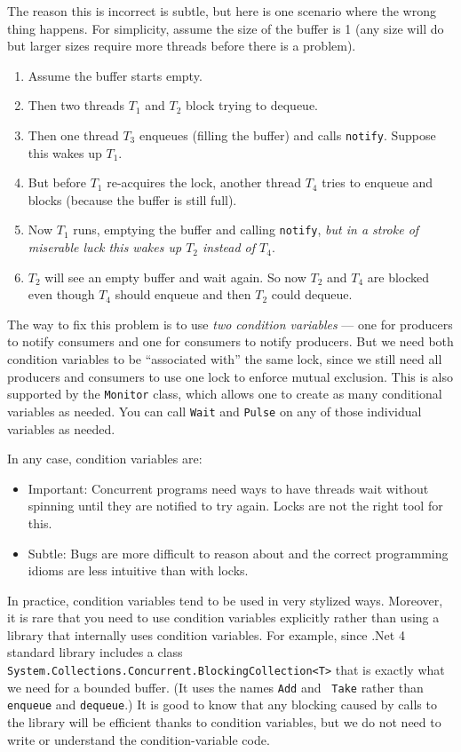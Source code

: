 \documentclass[10pt]{article}
\begin{document}
The reason this is incorrect is subtle, but here is one scenario where
the wrong thing happens.  For simplicity, assume the size of the
buffer is 1 (any size will do but larger sizes require more threads
before there is a problem).
\begin{enumerate}
\item Assume the buffer starts empty.
\item Then two threads $T_1$ and $T_2$ block trying to dequeue.
\item Then one thread $T_3$ enqueues (filling the buffer) and calls
  {\tt notify}.  Suppose this wakes up $T_1$.
\item But before $T_1$ re-acquires the lock, another thread $T_4$
  tries to enqueue and blocks (because the buffer is still full).
\item Now $T_1$ runs, emptying the buffer and calling {\tt notify},
  \emph{but in a stroke of miserable luck this wakes up $T_2$ instead
  of $T_4$}.
\item $T_2$ will see an empty buffer and wait again.  So now $T_2$ and
  $T_4$ are blocked even though $T_4$ should enqueue and then $T_2$
  could dequeue.
\end{enumerate}

The way to fix this problem is to use \emph{two condition variables}
--- one for producers to notify consumers and one for consumers to
notify producers.  But we need both condition variables to be
``associated with'' the same lock, since we still need all producers
and consumers to use one lock to enforce mutual exclusion.  This is
also supported by the {\tt Monitor} class, which allows one to create 
as many conditional variables as needed. You can call {\tt Wait} and 
{\tt Pulse} on any of those individual variables as needed.

In any case, condition variables are:
\begin{itemize}
\item Important: Concurrent programs need ways to have threads wait
  without spinning until they are notified to try again.  Locks are
  not the right tool for this.
\item Subtle: Bugs are more difficult to reason about and the
  correct programming idioms are less intuitive than with locks.
\end{itemize}
In practice, condition variables tend to be used in very stylized
ways.  Moreover, it is rare that you need to use condition variables
explicitly rather than using a library that internally uses condition
variables.  For example, since .Net 4 standard library includes a class
{\tt System.Collections.Concurrent.BlockingCollection<T>} that is exactly what
we need for a bounded buffer.  (It uses the names {\tt Add} and {\tt
  Take} rather than {\tt enqueue} and {\tt dequeue}.)  It is good to
know that any blocking caused by calls to the library will be
efficient thanks to condition variables, but we do not need to write
or understand the condition-variable code.
\end{document}
